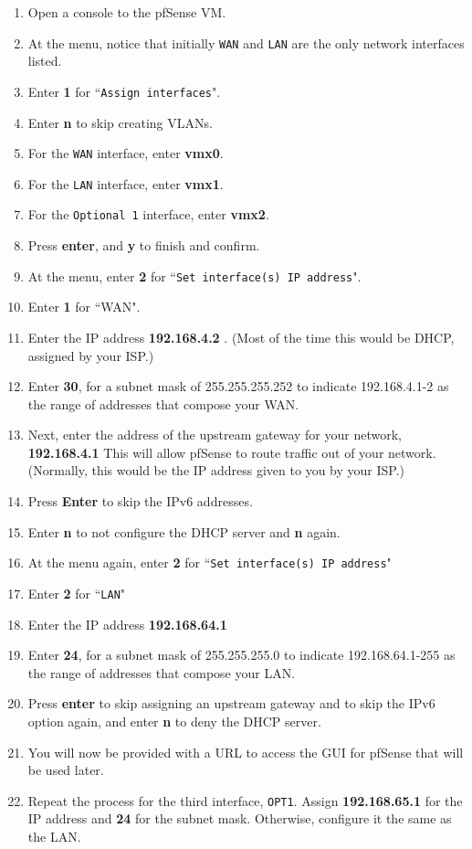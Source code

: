 \documentclass[12pt]{extarticle}
\begin{document}
\vspace{8mm}
\begin{enumerate}
\item Open a console to the pfSense VM.
\item At the menu, notice that initially \texttt{WAN} and \texttt{LAN} are the only network interfaces listed.

\item Enter \textbf{1} for ``{\texttt{Assign interfaces}}".
\item Enter \textbf{n} to skip creating VLANs.
\item For the \texttt{WAN} interface, enter \textbf{vmx0}.
\item For the \texttt{LAN} interface, enter \textbf{vmx1}.
\item For the \texttt{Optional 1} interface, enter \textbf{vmx2}.
\item Press \textbf{enter}, and \textbf{y} to finish and confirm.

\item At the menu, enter \textbf{2} for ``{\texttt{Set interface(s) IP address}}".
\item Enter \textbf{1} for ``WAN".
\item Enter the IP address \textbf{192.168.4.2} . (Most of the time this would be DHCP, assigned by your ISP.)
\item Enter \textbf{30}, for a subnet mask of 255.255.255.252 to indicate 192.168.4.1-2 as the range of addresses that compose your WAN.
\item Next, enter the address of the upstream gateway for your network, \textbf{192.168.4.1} This will allow pfSense to route traffic out of your network. (Normally, this would be the IP address given to you by your ISP.)
\item Press \textbf{Enter} to skip the IPv6 addresses.
\item Enter \textbf{n} to not configure the DHCP server and \textbf{n} again.

\item At the menu again, enter \textbf{2} for ``\texttt{Set interface(s) IP address}"
\item Enter \textbf{2} for ``\texttt{LAN}"
\item Enter the IP address \textbf{192.168.64.1}
\item Enter \textbf{24}, for a subnet mask of 255.255.255.0 to indicate 192.168.64.1-255 as the range of addresses that compose your LAN.
\item Press \textbf{enter} to skip assigning an upstream gateway and to skip the IPv6 option again, and enter \textbf{n} to deny the DHCP server.
\item You will now be provided with a URL to access the GUI for pfSense that will be used later.

\item Repeat the process for the third interface, \texttt{OPT1}. Assign \textbf{192.168.65.1} for the IP address and \textbf{24} for the subnet mask. Otherwise, configure it the same as the LAN.
\end{enumerate}
\end{document}
